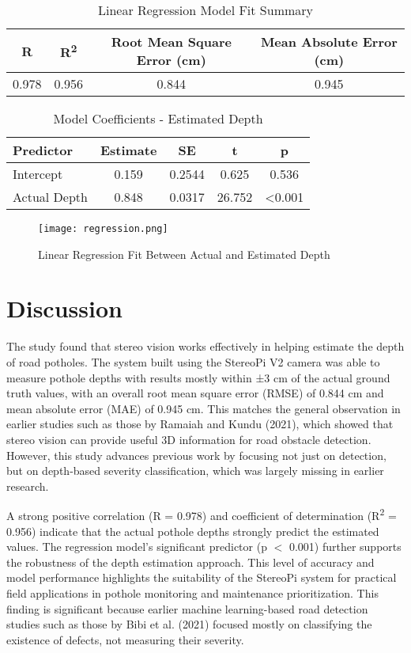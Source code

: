 \begin{table}[H]
	\centering
	\begin{tabular}{|c|c|c|c|}
		\hline
		\textbf{R} & \textbf{R\textsuperscript{2}} & \textbf{Root Mean Square Error (cm)} & \textbf{Mean Absolute Error (cm)} \\
		\hline
		0.978 & 0.956 & 0.844 & 0.945 \\
		\hline
	\end{tabular}
	\caption{Linear Regression Model Fit Summary}
	\label{tab:model_fit}
\end{table}

\begin{table}[H]
	\centering
	\begin{tabular}{|l|c|c|c|c|}
		\hline
		\textbf{Predictor} & \textbf{Estimate} & \textbf{SE} & \textbf{t} & \textbf{p} \\
		\hline
		Intercept & 0.159 & 0.2544 & 0.625 & 0.536 \\
		Actual Depth & 0.848 & 0.0317 & 26.752 & \textless 0.001 \\
		\hline
	\end{tabular}
	\caption{Model Coefficients - Estimated Depth}
	\label{tab:model_coefficients}
\end{table}

\begin{figure}[H]
	\centering
	\texttt{[image: regression.png]}
	\caption{Linear Regression Fit Between Actual and Estimated Depth}
	\label{fig:model}
\end{figure}


\section{Discussion}
The study found that stereo vision works effectively in helping estimate the depth of road potholes. The system built using the StereoPi V2 camera was able to measure pothole depths with results mostly within ±3 cm of the actual ground truth values, with an overall root mean square error (RMSE) of 0.844 cm and mean absolute error (MAE) of 0.945 cm. This matches the general observation in earlier studies such as those by Ramaiah and Kundu (2021), which showed that stereo vision can provide useful 3D information for road obstacle detection. However, this study advances previous work by focusing not just on detection, but on depth-based severity classification, which was largely missing in earlier research.

A strong positive correlation (R = 0.978) and coefficient of determination (R\textsuperscript{2} = 0.956) indicate that the actual pothole depths strongly predict the estimated values. The regression model’s significant predictor (p $<$ 0.001) further supports the robustness of the depth estimation approach. This level of accuracy and model performance highlights the suitability of the StereoPi system for practical field applications in pothole monitoring and maintenance prioritization. This finding is significant because earlier machine learning-based road detection studies such as those by Bibi et al. (2021) focused mostly on classifying the existence of defects, not measuring their severity.

